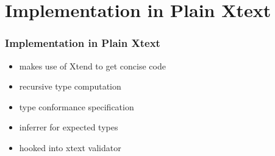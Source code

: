 \section[Plain Xtext]{Implementation in Plain Xtext}

\begin{frame}
  \tableofcontents[currentsection]
\end{frame}

\begin{frame}
  \frametitle{Implementation in Plain Xtext}
  \begin{itemize}
    \item makes use of Xtend to get concise code
    \item recursive type computation
    \item type conformance specification
    \item inferrer for expected types
    \item hooked into xtext validator
  \end{itemize}



\framebreak
\begin{footnotesize}

\end{footnotesize}

\end{frame}